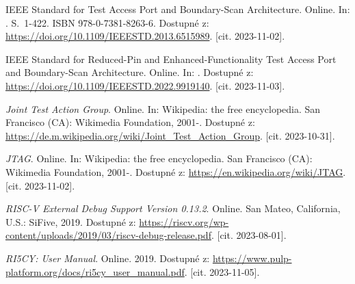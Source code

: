

\begin{thebibliography}{99}

IEEE Standard for Test Access Port and Boundary-Scan Architecture. Online. In: . S.~1-422. ISBN 978-0-7381-8263-6. Dostupné z: \url{https://doi.org/10.1109/IEEESTD.2013.6515989}. [cit. 2023-11-02].

IEEE Standard for Reduced-Pin and Enhanced-Functionality Test Access Port and Boundary-Scan Architecture. Online. In: . Dostupné z: \url{https://doi.org/10.1109/IEEESTD.2022.9919140}. [cit. 2023-11-03].

\textit{Joint Test Action Group}. Online. In: Wikipedia: the free encyclopedia. San Francisco (CA): Wikimedia Foundation, 2001-. Dostupné z: \url{https://de.m.wikipedia.org/wiki/Joint\_Test\_Action\_Group}. [cit. 2023-10-31].

\textit{JTAG}. Online. In: Wikipedia: the free encyclopedia. San Francisco (CA): Wikimedia Foundation, 2001-. Dostupné z: \url{https://en.wikipedia.org/wiki/JTAG}. [cit. 2023-11-02].

\textit{RISC-V External Debug Support Version 0.13.2}. Online. San Mateo, California, U.S.: SiFive, 2019. Dostupné z: \url{https://riscv.org/wp-content/uploads/2019/03/riscv-debug-release.pdf}. [cit. 2023-08-01].

\textit{RI5CY: User Manual}. Online. 2019. Dostupné z: \url{https://www.pulp-platform.org/docs/ri5cy\_user\_manual.pdf}. [cit. 2023-11-05].

\end{thebibliography}


%
%
%
